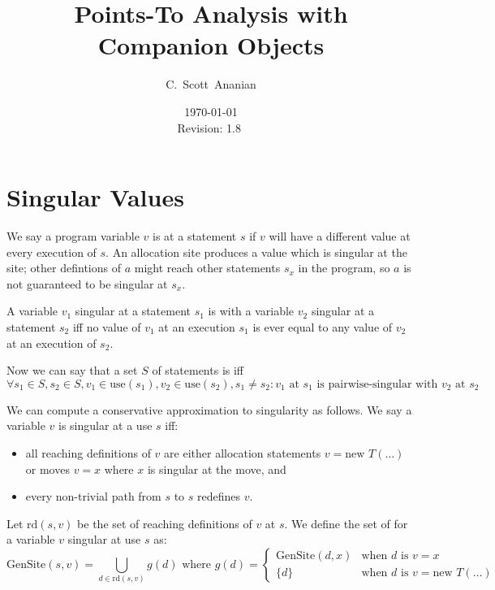 \documentclass[11pt,notitlepage]{article}
\author{C.~Scott~Ananian}
\title{Points-To Analysis with Companion Objects}
\date{\today \\ $ $Revision: 1.8 $ $}
\begin{document}

\maketitle
\section{Singular Values}

We say a program variable $v$ is  at a statement $s$
if $v$ will have a different value at every execution of $s$.  An
allocation site  produces a value which is singular
at the site; other defintions of $a$ might reach other statements
$s_x$ in the program, so $a$ is not guaranteed to be singular at $s_x$.

A variable $v_1$ singular at a statement $s_1$ is
 with a variable $v_2$ singular at a statement
$s_2$ iff no value of $v_1$ at an execution $s_1$ is ever equal to any
value of $v_2$ at an execution of $s_2$.

Now we can say that a set $S$ of statements is
 iff
\begin{displaymath}
\forall s_1 \in S, s_2 \in S, v_1 \in \text{use}(s_1), v_2 \in \text{use}(s_2),
  s_1 \neq s_2 :
v_1 \text{ at } s_1 \text{ is pairwise-singular with } v_2 \text{ at } s_2
\end{displaymath}

We can compute a conservative approximation to singularity as follows.
We say a variable $v$ is singular at a use $s$ iff:
\begin{itemize}
\item all reaching definitions of $v$ are either allocation statements 
$v = \text{new }T(\ldots)$ or moves $v = x$ where $x$ is singular at
the move, and
\item every non-trivial path from $s$ to $s$ redefines $v$.
\end{itemize}

Let $\text{rd}(s,v)$ be the set of reaching definitions of $v$ at $s$.
We define the set of  for a variable $v$ singular at
use $s$ as:
\begin{displaymath}
\text{GenSite}(s,v) %
 =
\bigcup_{d \in \text{rd}(s,v)} g(d)
\text{ where }
g(d) = \left\{ \begin{array}{cl}
                \text{GenSite}(d,x) &\text{when } d \text{ is } v=x \\
		\{d\}&\text{when } d \text{ is } v=\text{new } T(\ldots)
                \end{array}\right.
\end{displaymath}
\end{document}
